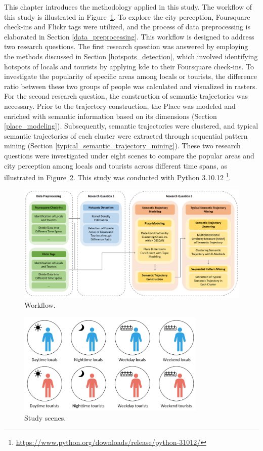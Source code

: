 \documentclass{article}
\theoremstyle{remark}
\begin{document}
This chapter introduces the methodology applied in this study. The workflow of this study is illustrated in Figure~\ref{fig:workflow}. To explore the city perception, Foursquare check-ins and Flickr tags were utilized, and the process of data preprocessing is elaborated in Section \ref{data_preprocessing}. This workflow is designed to address two research questions. The first research question was answered by employing the methods discussed in Section \ref{hotspots_detection}, which involved identifying hotspots of locals and tourists by applying \acrfull{kde} to their Foursquare check-ins. To investigate the popularity of specific areas among locals or tourists, the difference ratio between these two groups of people was calculated and visualized in rasters. For the second research question, the construction of semantic trajectories was necessary. Prior to the trajectory construction, the Place was modeled and enriched with semantic information based on its dimensions (Section \ref{place_modeling}). Subsequently, semantic trajectories were clustered, and typical semantic trajectories of each cluster were extracted through sequential pattern mining (Section \ref{typical_semantic_trajectory_mining}). These two research questions were investigated under eight scenes to compare the popular areas and city perception among locals and tourists across different time spans, as illustrated in Figure~\ref{fig:scene}. This study was conducted with Python 3.10.12 \footnote{\url{https://www.python.org/downloads/release/python-31012/}}.


\begin{figure}[h!]
\centering
\includegraphics[width=1\textwidth]{figures/workflow.png}
\caption{\label{fig:workflow}Workflow.}
\end{figure}


\begin{figure}[h!]
\centering
\includegraphics[width=0.8\textwidth]{figures/scene.png}
\caption{\label{fig:scene}Study scenes.}
\end{figure}
\end{document}
